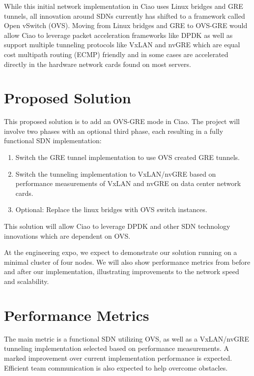 \documentclass[10pt,letterpaper,onecolumn,draftclsnofoot]{IEEEtran}
\begin{document}
While this initial network implementation in Ciao uses Linux bridges and GRE
tunnels, all innovation around SDNs currently has shifted to a framework called
Open vSwitch (OVS). Moving from Linux bridges and GRE to OVS-GRE would allow
Ciao to leverage packet acceleration frameworks like DPDK as well as support
multiple tunneling protocols like VxLAN and nvGRE which are equal cost multipath
routing (ECMP) friendly and in some cases are accelerated directly in the
hardware network cards found on most servers.

\section*{Proposed Solution}
This proposed solution is to add an OVS-GRE mode in Ciao. The project will 
involve two phases with an optional third phase, each resulting in a fully 
functional SDN implementation:

\begin{enumerate}
	\item Switch the GRE tunnel implementation to use OVS created GRE 
		tunnels.
	\item Switch the tunneling implementation to VxLAN/nvGRE based on
		performance measurements of VxLAN and nvGRE on data center
		network cards.
	\item Optional: Replace the linux bridges with OVS switch instances.
\end{enumerate}
This solution will allow Ciao to leverage DPDK and other SDN technology
innovations which are dependent on OVS.

At the engineering expo, we expect to demonstrate our solution running on a
minimal cluster of four nodes. We will also show performance metrics from before
and after our implementation, illustrating improvements to the network speed and
scalability.

\section*{Performance Metrics}
The main metric is a functional SDN utilizing OVS, as well as a VxLAN/nvGRE
tunneling implementation selected based on performance measurements. A marked
improvement over current implementation performance is expected. Efficient team
communication is also expected to help overcome obstacles.

\clearpage
\end{document}
